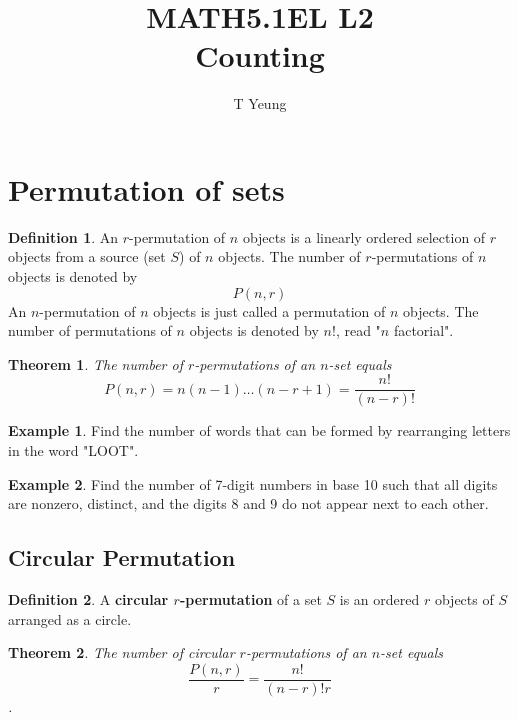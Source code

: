 \documentclass[addpoints]{exam}
\title{MATH5.1EL L2 \\ Counting}
\author{T Yeung}
\date{}
\newtheorem{theorem}{Theorem}[section]
\theoremstyle{definition}
\newtheorem{defn}{Definition}[section]
\newtheorem{exmp}{Example}[section]
\begin{document}
\maketitle

\noindent
{}
\vspace{0.3in}

\section{Permutation of sets}
\begin{defn}
An $r$-permutation of $n$ objects is a linearly ordered selection of $r$ objects from a source (set $S$) of $n$ objects. The number of $r$-permutations of $n$ objects is denoted by
\begin{equation*}
	P(n, r)
\end{equation*}
An $n$-permutation of $n$ objects is just called a permutation of $n$ objects. The number of permutations of $n$ objects is denoted by $n!$, read "$n$ factorial".
\end{defn}

\begin{theorem}
The number of $r$-permutations of an $n$-set equals
\begin{equation*}
	P(n, r) = n(n-1)\ldots(n-r+1)= \frac{n!}{(n-r)!}
\end{equation*}
\end{theorem}

\begin{exmp}
	Find the number of words that can be formed by rearranging letters in the word "LOOT".
\end{exmp}

\begin{exmp}
	Find the number of 7-digit numbers in base 10 such that all digits are nonzero, distinct, and the digits 8 and 9 do not appear next to each other.
\end{exmp}

\subsection{Circular Permutation}
\begin{defn}
	A \textbf{circular $r$-permutation} of a set $S$ is an ordered $r$ objects of $S$ arranged as a circle.
\end{defn}

\begin{theorem}
	The number of circular $r$-permutations of an $n$-set equals
	\begin{equation*}
		\frac{P(n, r)}{r} = \frac{n!}{(n-r)!r}
	\end{equation*}.
\end{theorem}
\end{document}
